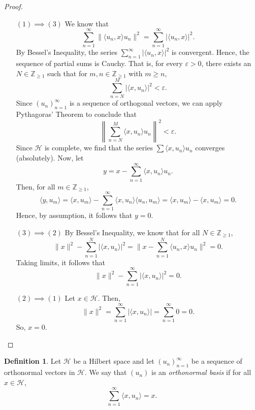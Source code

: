 \documentclass[a4paper, openany]{memoir}
\theoremstyle{definition}
\newtheorem{definition}{Definition}[section]
\theoremstyle{plain}
\begin{document}
    \begin{proof}
        \hspace*{0pt}
        \begin{enumerate}
            \item[$(1) \implies (3)$] We know that 
            \[\sum_{n=1}^\infty \lVert \langle u_n, x \rangle u_n \rVert^2 = \sum_{n=1}^\infty |\langle u_n, x \rangle|^2.\]
            By Bessel's Inequality, the series $\sum_{n=1}^\infty |\langle u_n, x \rangle|^2$ is convergent. Hence, the sequence of partial sums is Cauchy. That is, for every $\varepsilon > 0$, there exists an $N \in \mathbb{Z}_{\geq 1}$ such that for $m, n \in \mathbb{Z}_{\geq 1}$ with $m \geq n$,
            \[\sum_{n=N}^M |\langle x, u_n \rangle|^2 < \varepsilon.\]
            Since $(u_n)_{n=1}^\infty$ is a sequence of orthogonal vectors, we can apply Pythagoras' Theorem to conclude that
            \[\left\lVert \sum_{n=N}^M \langle x, u_n \rangle u_n \right\rVert^2 < \varepsilon.\]
            Since $\mathcal{H}$ is complete, we find that the series $\sum \langle x, u_n \rangle u_n$ converges (absolutely). 
            Now, let 
            \[y = x - \sum_{n=1}^\infty \langle x, u_n \rangle u_n.\]
            Then, for all $m \in \mathbb{Z}_{\geq 1}$,
            \[\langle y, u_m \rangle = \langle x, u_m \rangle - \sum_{n=1}^\infty \langle x, u_n \rangle \langle u_n, u_m \rangle = \langle x, u_m \rangle - \langle x, u_m \rangle = 0.\]
            Hence, by assumption, it follows that $y = 0$.
            
            \item[$(3) \implies (2)$] By Bessel's Inequality, we know that for all $N \in \mathbb{Z}_{\geq 1}$,
            \[\lVert x \rVert^2 - \sum_{n=1}^N |\langle x, u_n \rangle|^2 = \lVert x - \sum_{n=1}^N \langle u_n, x \rangle u_n \rVert^2 = 0.\]
            Taking limits, it follows that 
            \[\lVert x \rVert^2 - \sum_{n=1}^\infty |\langle x, u_n \rangle|^2 = 0.\]
            
            \item[$(2) \implies (1)$] Let $x \in \mathcal{H}$. Then,
            \[\lVert x \rVert^2 = \sum_{n=1}^\infty |\langle x, u_n \rangle| = \sum_{n=1}^\infty 0 = 0.\]
            So, $x = 0$.
        \end{enumerate}
    \end{proof}

    \begin{definition}
        Let $\mathcal{H}$ be a Hilbert space and let $(u_n)_{n=1}^\infty$ be a sequence of orthonormal vectors in $\mathcal{H}$. We say that $(u_n)$ is an \emph{orthonormal basis} if for all $x \in \mathcal{H}$,
        \[\sum_{n=1}^\infty \langle x, u_n \rangle = x.\]
    \end{definition}
\end{document}

